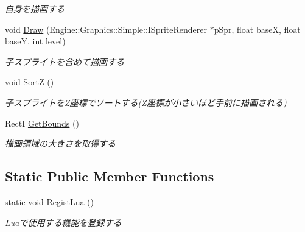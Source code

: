 \begin{DoxyCompactItemize}
\begin{DoxyCompactList}\small\item\em 自身を描画する \end{DoxyCompactList}\item 
void \hyperlink{class_sprite_ad397965cd4e7cfc0c1fc9fead78c757d}{Draw} (Engine\+::\+Graphics\+::\+Simple\+::\+I\+Sprite\+Renderer $\ast$p\+Spr, float baseX, float baseY, int level)\hypertarget{class_sprite_ad397965cd4e7cfc0c1fc9fead78c757d}{}\label{class_sprite_ad397965cd4e7cfc0c1fc9fead78c757d}

\begin{DoxyCompactList}\small\item\em 子スプライトを含めて描画する \end{DoxyCompactList}\item 
void \hyperlink{class_sprite_a24a595468adde636a8b820874e20e1ca}{SortZ} ()\hypertarget{class_sprite_a24a595468adde636a8b820874e20e1ca}{}\label{class_sprite_a24a595468adde636a8b820874e20e1ca}

\begin{DoxyCompactList}\small\item\em 子スプライトを\+Z座標でソートする(Z座標が小さいほど手前に描画される) \end{DoxyCompactList}\item 
RectI \hyperlink{class_sprite_a5c2932082f60140474753006a3897287}{Get\+Bounds} ()\hypertarget{class_sprite_a5c2932082f60140474753006a3897287}{}\label{class_sprite_a5c2932082f60140474753006a3897287}

\begin{DoxyCompactList}\small\item\em 描画領域の大きさを取得する \end{DoxyCompactList}\end{DoxyCompactItemize}
\subsection*{Static Public Member Functions}
\begin{DoxyCompactItemize}
\item 
static void \hyperlink{class_sprite_a15b80053ef337d4f35eed273302773ff}{Regist\+Lua} ()\hypertarget{class_sprite_a15b80053ef337d4f35eed273302773ff}{}\label{class_sprite_a15b80053ef337d4f35eed273302773ff}

\begin{DoxyCompactList}\small\item\em Luaで使用する機能を登録する \end{DoxyCompactList}\end{DoxyCompactItemize}
